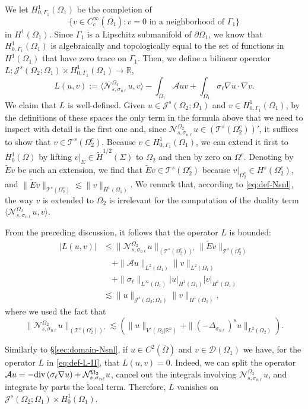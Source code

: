 \documentclass{amsart}
\newcommand{\Ol}{\Omega_{1}}%
\newcommand{\Onl}{\Omega_{2}}%
\newcommand{\Gl}{{\Gamma_1}}%
\renewcommand{\sl}{{\sigma_\ell}}
\newcommand{\snl}{{\sigma_{n\ell}}}
\def\calT{\mathcal{T}}
\def\calA{\mathcal{A}}
\def\R{{\mathbb R}}
\newcommand{\Nsnl}{\mathcal{N}_{s,\snl}}
\renewcommand{\div}{{\rm div}\,}
\theoremstyle{plain}
\numberwithin{equation}{section}
\numberwithin{table}{section}
\numberwithin{figure}{section}
\numberwithin{theorem}{section}
\numberwithin{corollary}{section}
\numberwithin{definition}{section}
\numberwithin{lemma}{section}
\numberwithin{proposition}{section}
\numberwithin{remark}{section}
\begin{document}
We let $H^1_{0,\Gl}(\Ol)$ be the completion of
\[ \{ v \in C^\infty_c(\overline{\Ol}) \colon v=0 \mbox{ in a neighborhood of } \Gl\}  \]
in $H^1(\Ol)$. Since $\Gl$ is a Lipschitz submanifold of $\partial\Ol$, we know that $H^1_{0,\Gl}(\Ol)$ is algebraically and topologically equal to the set of functions in $H^1(\Ol)$ that have zero trace on $\Gl$. Then, we define a bilinear operator $L \colon \mathcal{J}^s(\Onl; \Ol) \times H^1_{0,\Gl}(\Ol) \to \R$,
\begin{equation} \label{eq:def-L-II}
L(u,v) := \langle \Nsnl^{\Onl} u , v \rangle
- \int_{\Ol} \mathcal{A} u v + \int_{\Ol} \sl \nabla u \cdot \nabla v .
\end{equation}
We claim that $L$ is well-defined. Given $u \in \mathcal{J}^s(\Onl;\Ol) $ and $v \in H^1_{0,\Gl}(\Ol)$, by the definitions of these spaces the only term in the formula above that we need to inspect with detail is the first one and, since $\Nsnl^{\Onl} u \in \left( \calT^{s}(\Onl^c)\right)'$, it suffices to show that $v \in \calT^{s}(\Onl^c)$. Because  $v \in H^1_{0,\Gl}(\Ol)$, we can extend it first to $H^1_0(\Omega)$ by lifting  $v|_{\Sigma}\in\widetilde{H}^{1/2}(\Sigma)$ to $\Onl$ and then by zero on $\Omega^c$. Denoting by $\tilde E v$ be such an extension, we  find that $\tilde Ev \in \calT^{s}(\Onl^c)$ because $v|_{\Onl^c} \in H^s(\Onl^c)$, and $\| \tilde E v  \|_{\calT^{s}(\Onl^c)} \lesssim \|v \|_{H^1(\Ol)}$. We remark that, according to \eqref{eq:def-Nsnl}, the way $v$ is extended to $\Onl$ is irrelevant for the computation of the duality term $\langle \Nsnl^{\Onl} u , v \rangle$.

From the preceding discussion, it follows that the operator $L$ is bounded:
\[ \begin{split}
| L(u,v) | & \le \| \Nsnl^{\Onl} u  \|_{\left(\calT^{s}(\Onl^c)\right)'}  \| \tilde E v  \|_{\calT^{s}(\Onl^c)} \\ & \quad +  \| \mathcal{A} u \|_{L^2(\Ol)} \| v \|_{L^2(\Ol)} \\ & \quad  + \| \sl \|_{L^\infty(\Ol)} |u|_{H^1(\Ol)} |v|_{H^1(\Ol)} \\ 
 & \lesssim \| u \|_{\mathcal{J}^s(\Onl;\Ol)} \|v \|_{H^1(\Ol)},
\end{split}\]
where we used the fact that 
\[
\| \Nsnl^{\Onl} u  \|_{\left(\calT^{s}(\Onl^c)\right)'}\lesssim \left( \| u \|_{V^s(\Onl | \R^n)} +  \| (-\Delta_\snl)^s u \|_{L^2(\Onl)} \right).
\]


Similarly to \S\ref{sec:domain-Nsnl}, if $u \in C^2(\overline\Omega)$ and $v \in \mathcal{D}(\Ol)$ we have, for the operator $L$ in \eqref{eq:def-L-II}, that $L(u,v) = 0$. Indeed, we can split the operator $\calA u = -\div (\sl \nabla u) + \Nsnl^{\Onl} u$, cancel out the integrals involving  $\Nsnl^{\Onl} u$, and integrate by parts the local term. Therefore, $L$ vanishes on $\mathcal{J}^s(\Onl;\Ol) \times H^1_0(\Ol)$.
\end{document}
